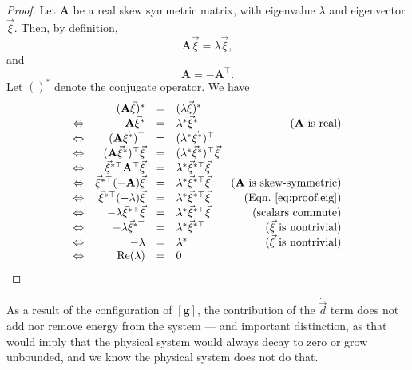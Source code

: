 \begin{proof}
Let $\mathbf{A}$ be a real skew symmetric matrix, with eigenvalue $\lambda$ and eigenvector $\vec\xi$. Then, by definition,
\begin{equation}
\mathbf{A}\vec\xi = \lambda\vec\xi,
\label{eq:proof.eig}
\end{equation}
and 
\begin{equation}
\mathbf{A} = -\mathbf{A}^\top.
\end{equation}
Let $()^*$ denote the conjugate operator. We have
\begin{equation}
\begin{array}{rrclr}
 & (\mathbf{A}\vec\xi)^* &=& (\lambda\vec\xi)^* & \\
\Leftrightarrow & \mathbf{A}\vec\xi^* &=& \lambda^*\vec\xi^* & (\mathbf{A}\text{ is real}) \\
\Leftrightarrow & (\mathbf{A}\vec\xi^*)^\top &=& (\lambda^*\vec\xi^*)^\top & \\
\Leftrightarrow & (\mathbf{A}\vec\xi^*)^\top\vec\xi &=& (\lambda^*\vec\xi^*)^\top\vec\xi & \\
\Leftrightarrow & \vec\xi^{*\top}\mathbf{A}^\top\vec\xi &=& \lambda^*\vec\xi^{*\top}\vec\xi & \\
\Leftrightarrow & \vec\xi^{*\top}(\mathbf{-A})\vec\xi &=& \lambda^*\vec\xi^{*\top}\vec\xi & (\mathbf{A}\text{ is skew-symmetric}) \\
\Leftrightarrow & \vec\xi^{*\top}(-\lambda)\vec\xi &=& \lambda^*\vec\xi^{*\top}\vec\xi & (\text{Eqn.~\ref{eq:proof.eig}}) \\
\Leftrightarrow & -\lambda\vec\xi^{*\top}\vec\xi &=& \lambda^*\vec\xi^{*\top}\vec\xi & (\text{scalars commute}) \\
\Leftrightarrow & -\lambda\vec\xi^{*\top} &=& \lambda^*\vec\xi^{*\top} & (\vec\xi\text{ is nontrivial})\\
\Leftrightarrow & -\lambda &=& \lambda^* & (\vec\xi\text{ is nontrivial})\\
\Leftrightarrow & \text{Re}(\lambda) &=& 0 & \\
\end{array}
\end{equation}
\end{proof}

As a result of the configuration of $\mathbf{[g]}$, the contribution of the $\dot{\vec d}$ term does not add nor remove energy from the system --- and important distinction, as that would imply that the physical system would always decay to zero or grow unbounded, and we know the physical system does not do that.
